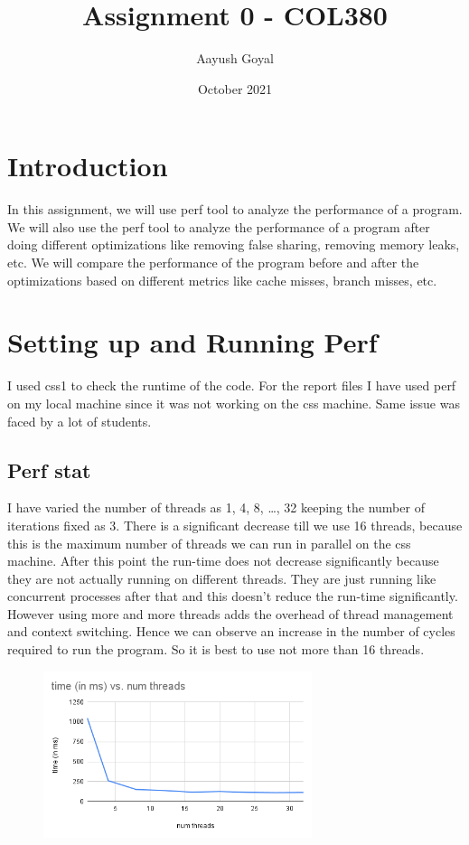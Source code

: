 \documentclass{article}
\title{Assignment 0 - COL380}
\author{Aayush Goyal}
\date{October 2021}
\begin{document}
\maketitle

\tableofcontents


\section{Introduction}
In this assignment, we will use perf tool to analyze the performance of a program. We will also use the perf tool to analyze the performance of a program after doing different optimizations like removing false sharing, removing memory leaks, etc. We will compare the performance of the program before and after the optimizations based on different metrics like cache misses, branch misses, etc.

\section{Setting up and Running Perf}
I used css1 to check the runtime of the code. For the report files I have used perf on my local machine since it was not working on the css machine. Same issue was faced by a lot of students.

\subsection{Perf stat}
I have varied the number of threads as 1, 4, 8, \dots, 32 keeping the number of iterations fixed as 3. There is a significant decrease till we use 16 threads, because this is the maximum number of threads we can run in parallel on the css machine. After this point the run-time does not decrease significantly because they are not actually running on different threads. They are just running like concurrent processes after that and this doesn't reduce the run-time significantly. However using more and more threads adds the overhead of thread management and context switching. Hence we can observe an increase in the number of cycles required to run the program. So it is best to use not more than 16 threads.
\begin{figure}[H]
\centering
\includegraphics[width=0.7\textwidth]{images/time_threads.png}
\end{figure}
\end{document}
